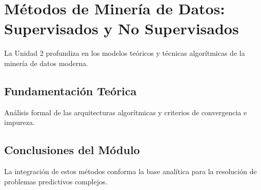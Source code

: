 \section{Métodos de Minería de Datos: Supervisados y No Supervisados}
\label{sec:u2_metodos_mineria_datos}
La Unidad 2 profundiza en los modelos teóricos y técnicas algorítmicas de la minería de datos moderna.
\subsection{Fundamentación Teórica}
Análisis formal de las arquitecturas algorítmicas y criterios de convergencia e impureza.

\subsection{Conclusiones del Módulo}
La integración de estos métodos conforma la base analítica para la resolución de problemas predictivos complejos.
